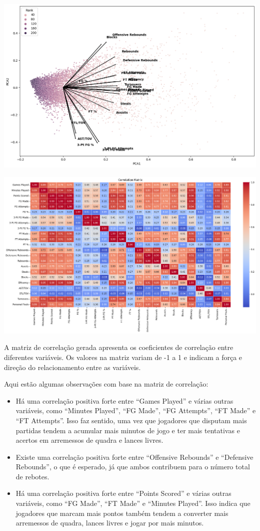\documentclass[
]{book}
\begin{document}
\includegraphics{imagens/4.png}

\includegraphics{imagens/5.png}

A matriz de correlação gerada apresenta os coeficientes de correlação entre diferentes variáveis. Os valores na matriz variam de -1 a 1 e indicam a força e direção do relacionamento entre as variáveis.

Aqui estão algumas observações com base na matriz de correlação:

\begin{itemize}
\item
  Há uma correlação positiva forte entre ``Games Played'' e várias outras variáveis, como ``Minutes Played'', ``FG Made'', ``FG Attempts'', ``FT Made'' e ``FT Attempts''. Isso faz sentido, uma vez que jogadores que disputam mais partidas tendem a acumular mais minutos de jogo e ter mais tentativas e acertos em arremessos de quadra e lances livres.
\item
  Existe uma correlação positiva forte entre ``Offensive Rebounds'' e ``Defensive Rebounds'', o que é esperado, já que ambos contribuem para o número total de rebotes.
\item
  Há uma correlação positiva forte entre ``Points Scored'' e várias outras variáveis, como ``FG Made'', ``FT Made'' e ``Minutes Played''. Isso indica que jogadores que marcam mais pontos também tendem a converter mais arremessos de quadra, lances livres e jogar por mais minutos.
\end{itemize}
\end{document}
